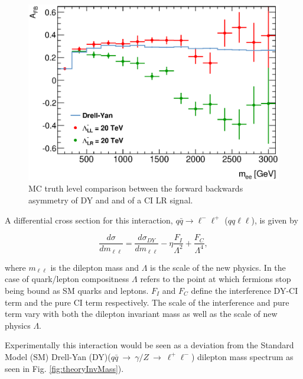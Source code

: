         \begin{figure}[h]
            \begin{center}
            \includegraphics[width=0.8\linewidth]{images/AFB_MC.eps}
            \end{center}
            \caption{MC truth level comparison between the forward backwards asymmetry of DY and and of a CI LR signal.}
            \label{fig:theoryAFB}
        \end{figure}

        A differential cross section for this interaction, $q\bar{q} \rightarrow \ell^{-}\ell^{+}$ ($qq\ell\ell$), is given by

        \begin{equation}
            \frac{d\sigma}{dm_{\ell\ell}} = 
                \frac{d\sigma_{DY}}{dm_{\ell\ell}} 
                - \eta\frac{F_{I}}{\Lambda^{2}} 
                + \frac{F_{C}}{\Lambda^{4}},
            \label{eq:DiffCross}
        \end{equation}

        where $m_{\ell\ell}$ is the dilepton mass and $\Lambda$ is the scale of the new physics. In the case of quark/lepton compositness $\Lambda$ refers to the point at which fermions stop being bound as SM quarks and leptons. $F_{I}$ and $F_{C}$ define the interference DY-CI term and the pure CI term respectively. The scale of the interference and pure term vary with both the dilepton invariant mass as well as the scale of new physics $\Lambda$.

        Experimentally this interaction would be seen as a deviation from the Standard Model (SM) Drell-Yan (DY)($q\bar{q}~\rightarrow~\gamma/Z~\rightarrow~\ell^{+}\ell^{-}$) dilepton mass spectrum as seen in Fig. \ref{fig:theoryInvMass}). 

